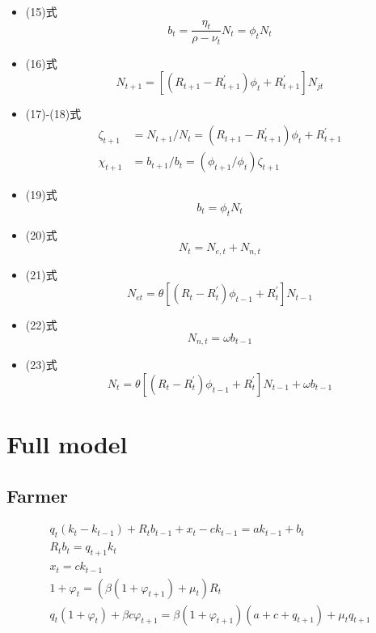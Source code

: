 \documentclass[dvipdfmx]{jlreq}
\begin{document}
\begin{itemize}
  \item (15)式
    \begin{equation}
      b_t = \frac{\eta_t}{\rho-\nu_t} N_{t} = \phi_t N_{t}
    \end{equation}

  \item (16)式
    \begin{equation}
      N_{t+1} = [(R_{t+1} - R^\prime_{t+1}) \phi_t + R^\prime_{t+1}] N_{jt}
    \end{equation}

  \item (17)-(18)式
    \begin{align}
      \zeta_{t+1} &= N_{t+1} / N_t = (R_{t+1} - R^\prime_{t+1}) \phi_t + R^\prime_{t+1} \\
      \chi_{t+1} &= b_{t+1} / b_t = (\phi_{t+1} / \phi_t) \zeta_{t+1}
    \end{align}

  \item (19)式
    \begin{equation}
      b_t = \phi_t N_t
    \end{equation}

  \item (20)式
    \begin{equation}
      N_t = N_{e, t} + N_{n, t}
    \end{equation}

  \item (21)式
    \begin{equation}
      N_{et} = \theta [(R_t - R^\prime_t) \phi_{t-1} + R^\prime_t] N_{t-1}
    \end{equation}

  \item (22)式
    \begin{equation}
      N_{n, t} = \omega b_{t-1}
    \end{equation}

  \item (23)式
    \begin{equation}
      N_t = \theta [(R_t - R^\prime_t) \phi_{t-1} + R^\prime_t] N_{t-1} + \omega b_{t-1}
    \end{equation}
\end{itemize}

\newpage

\section{Full model}
\subsection{Farmer}
\begin{gather}
  q_t(k_t-k_{t-1})+R_tb_{t-1}+x_t-ck_{t-1} = ak_{t-1}+b_t \\
  R_tb_t = q_{t+1}k_t \\
  x_t = ck_{t-1} \\
  1+\varphi_t = (\beta(1+\varphi_{t+1})+\mu_t)R_t \\
  q_t(1+\varphi_t)+\beta c\varphi_{t+1} = \beta(1+\varphi_{t+1})(a+c+q_{t+1})+\mu_tq_{t+1}
\end{gather}
\end{document}
